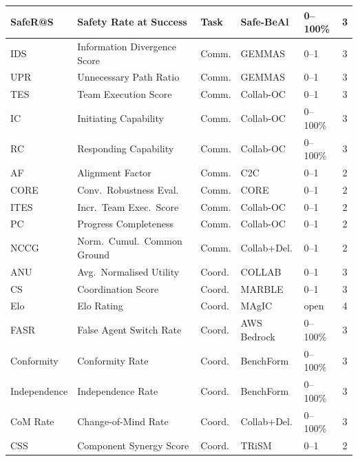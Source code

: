 \documentclass[11pt,a4paper]{article}
\begin{document}
\begin{longtable}{p{1.8cm}p{3.5cm}p{1.2cm}p{1.8cm}p{1.0cm}c}
  SafeR@S        & Safety Rate at Success         & Task    & Safe-BeAl         & 0--100\%   & 3 \\
  \midrule
  IDS            & Information Divergence Score   & Comm.   & GEMMAS            & 0--1       & 3 \\
  UPR            & Unnecessary Path Ratio         & Comm.   & GEMMAS            & 0--1       & 3 \\
  TES            & Team Execution Score           & Comm.   & Collab-OC         & 0--1       & 3 \\
  IC             & Initiating Capability          & Comm.   & Collab-OC         & 0--100\%   & 3 \\
  RC             & Responding Capability          & Comm.   & Collab-OC         & 0--100\%   & 3 \\
  AF             & Alignment Factor               & Comm.   & C2C               & 0--1       & 2 \\
  CORE           & Conv.\ Robustness Eval.        & Comm.   & CORE              & 0--1       & 2 \\
  ITES           & Incr.\ Team Exec.\ Score       & Comm.   & Collab-OC         & 0--1       & 2 \\
  PC             & Progress Completeness          & Comm.   & Collab-OC         & 0--1       & 2 \\
  NCCG           & Norm.\ Cumul.\ Common Ground   & Comm.   & Collab+Del.       & 0--1       & 2 \\
  \midrule
  ANU            & Avg.\ Normalised Utility       & Coord.  & COLLAB            & 0--1       & 3 \\
  CS             & Coordination Score             & Coord.  & MARBLE            & 0--1       & 3 \\
  Elo            & Elo Rating                     & Coord.  & MAgIC             & open       & 4 \\
  FASR           & False Agent Switch Rate        & Coord.  & AWS Bedrock       & 0--100\%   & 3 \\
  Conformity     & Conformity Rate                & Coord.  & BenchForm         & 0--100\%   & 3 \\
  Independence   & Independence Rate              & Coord.  & BenchForm         & 0--100\%   & 3 \\
  CoM Rate       & Change-of-Mind Rate            & Coord.  & Collab+Del.       & 0--100\%   & 3 \\
  CSS            & Component Synergy Score        & Coord.  & TRiSM             & 0--1       & 2 \\

\end{longtable}
\end{document}
